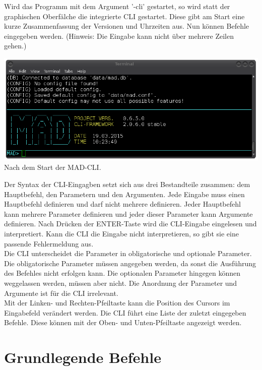 \documentclass[12pt,a4paper]{report}
\begin{document}
Wird das Programm mit dem Argument '-cli' gestartet, so wird statt der graphischen Oberfälche die integrierte CLI gestartet. Diese gibt am Start eine kurze Zusammenfassung der Versionen und Uhrzeiten aus. Nun können Befehle eingegeben werden. (Hinweis: Die Eingabe kann nicht über mehrere Zeilen gehen.)\\

\begin{center}
\includegraphics[scale=0.5]{img/cli_mad.png}\\
Nach dem Start der MAD-CLI.
\end{center}

Der Syntax der CLI-Eingagben setzt sich aus drei Bestandteile zusammen: dem Hauptbefehl, den Parametern und den Argumenten. Jede Eingabe muss einen Hauptbefehl definieren und darf nicht mehrere definieren. Jeder Hauptbefehl kann mehrere Parameter definieren und jeder dieser Parameter kann Argumente definieren. Nach Drücken der ENTER-Taste wird die CLI-Eingabe eingelesen und interpretiert. Kann die CLI die Eingabe nicht interpretieren, so gibt sie eine passende Fehlermeldung aus.\\

Die CLI unterscheidet die Parameter in obligatorische und optionale Parameter. Die obligatorische Parameter müssen angegeben werden, da sonst die Ausführung des Befehles nicht erfolgen kann. Die optionalen Parameter hingegen können weggelassen werden, müssen aber nicht. Die Anordnung der Parameter und Argumente ist für die CLI irrelevant.\\

Mit der Linken- und Rechten-Pfeiltaste kann die Position des Cursors im Eingabefeld verändert werden. Die CLI führt eine Liste der zuletzt eingegeben Befehle. Diese können mit der Oben- und Unten-Pfeiltaste angezeigt werden.

\section{Grundlegende Befehle}
\end{document}
